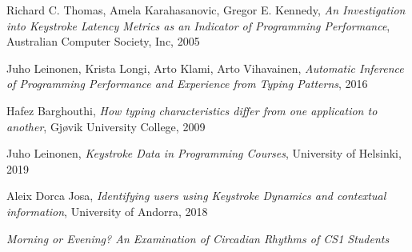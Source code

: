 \begin{thebibliography}{99}

 Richard C. Thomas, Amela Karahasanovic, Gregor E. Kennedy,
    \textit{An Investigation into
    Keystroke Latency Metrics as an Indicator of Programming Performance},
    Australian Computer Society, Inc, 2005

 Juho Leinonen, Krista Longi, Arto Klami, Arto Vihavainen, \textit{Automatic Inference of Programming Performance and
Experience from Typing Patterns}, 2016

 Hafez Barghouthi, \textit{How typing characteristics differ from one
application to another}, Gjøvik University College, 2009

 Juho Leinonen, \textit{Keystroke Data in
    Programming Courses}, University of Helsinki, 2019

 Aleix Dorca Josa, \textit{Identifying users using Keystroke Dynamics
and contextual information}, University of Andorra, 2018

 \textit{Morning or Evening? An Examination of Circadian
Rhythms of CS1 Students}




\end{thebibliography}
